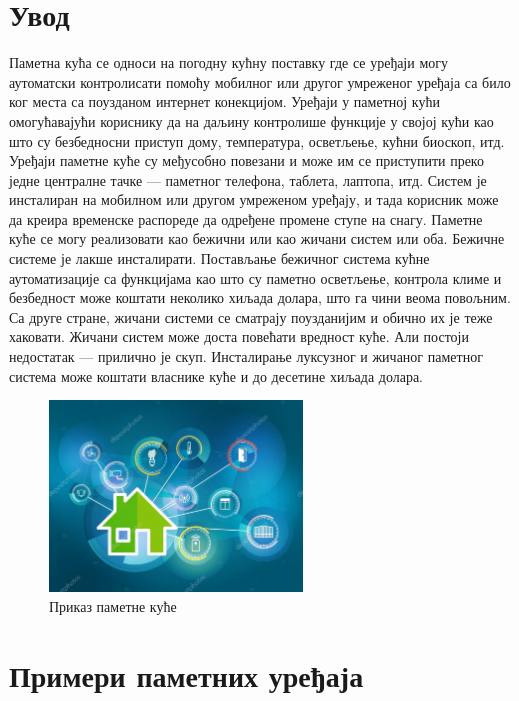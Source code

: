 \documentclass[a4paper]{article}
\begin{document}
\section{Увод}
Паметна кућа се односи на погодну кућну поставку где се уређаји могу аутоматски контролисати помоћу мобилног или другог умреженог уређаја са било ког места са поузданом интернет конекцијом.
Уређаји у паметној кући омогућавајући кориснику да на даљину контролише функције у својој кући као што су безбедносни приступ дому,
температура, осветљење, кућни биоскоп, итд.
\newline\newline
Уређаји паметне куће су међусобно повезани и може им се приступити преко једне централне тачке — паметног телефона, таблета, лаптопа, итд.
Систем је инсталиран на мобилном или другом умреженом уређају, и тада корисник може да креира временске распореде да одређене промене ступе на снагу.
\newline\newline
Паметне куће се могу реализовати као бежични или као жичани систем или оба. Бежичне системе је лакше инсталирати. Постављање бежичног система кућне аутоматизације са функцијама
као што су паметно осветљење, контрола климе и безбедност може коштати неколико хиљада долара, што га чини веома повољним. Са друге стране, жичани системи се сматрају поузданијим
и обично их је теже хаковати. Жичани систем може доста повећати вредност куће. Али постоји недостатак — прилично је скуп. Инсталирање луксузног и жичаног паметног система може
коштати власнике куће и до десетине хиљада долара.
\newline\newline
\begin{figure}[h!]
    \centering
    \includegraphics[width=0.6\textwidth]{Slike/smart_home.jpg}
    \caption{\label{fig:smart}Приказ паметне куће}
\end{figure}

\newpage
\section{Примери паметних уређаја}
\end{document}
